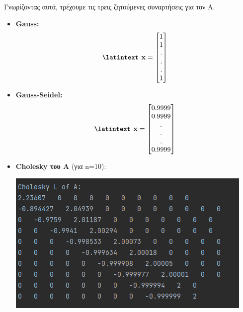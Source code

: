 \documentclass{article}
\newcommand{\lt}{\latintext}
\newcommand{\gt}{\greektext}
\begin{document}
\gt Γνωρίζοντας αυτά, τρέχουμε τις τρεις ζητούμενες συναρτήσεις για τον Α.
\newpage
\begin{itemize}
    \item \textbf{\lt Gauss:}\\
    \begin{equation*}
        \textbf{\lt x} = 
        \begin{bmatrix}
            1 \\
            1 \\
            .\\
            .\\
            .\\
            1 
        \end{bmatrix}
    \end{equation*}
    \item \textbf{\lt Gauss-Seidel:}\\
    \begin{equation*}
        \textbf{\lt x} = 
        \begin{bmatrix}
            0.9999 \\
            0.9999 \\
            .\\
            .\\
            .\\
            0.9999 
        \end{bmatrix}
    \end{equation*}
    \item \textbf{\lt Cholesky \gt του Α} (για \lt n=10):\\
        \begin{center}
            \includegraphics[scale=0.7]{images/cholesky A n=10.png}        
        \end{center}
\end{itemize}
\end{document}
